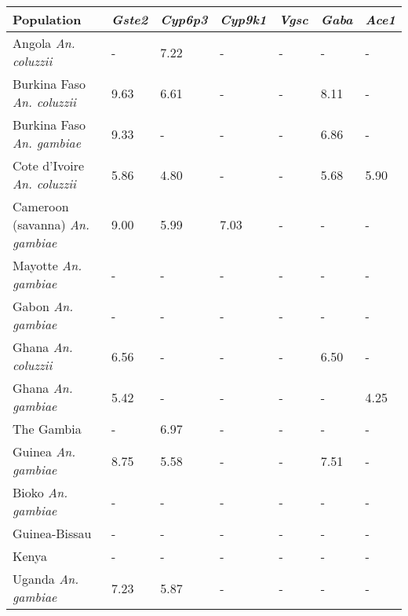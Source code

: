 \begin{tabular}{lllllll}
\toprule
                              Population & \textit{Gste2} & \textit{Cyp6p3} & \textit{Cyp9k1} & \textit{Vgsc} & \textit{Gaba} & \textit{Ace1} \\
\midrule
            Angola \textit{An. coluzzii} &              - &            7.22 &               - &             - &             - &             - \\
      Burkina Faso \textit{An. coluzzii} &           9.63 &            6.61 &               - &             - &          8.11 &             - \\
       Burkina Faso \textit{An. gambiae} &           9.33 &               - &               - &             - &          6.86 &             - \\
     Cote d'Ivoire \textit{An. coluzzii} &           5.86 &            4.80 &               - &             - &          5.68 &          5.90 \\
 Cameroon (savanna) \textit{An. gambiae} &           9.00 &            5.99 &            7.03 &             - &             - &             - \\
            Mayotte \textit{An. gambiae} &              - &               - &               - &             - &             - &             - \\
              Gabon \textit{An. gambiae} &              - &               - &               - &             - &             - &             - \\
             Ghana \textit{An. coluzzii} &           6.56 &               - &               - &             - &          6.50 &             - \\
              Ghana \textit{An. gambiae} &           5.42 &               - &               - &             - &             - &          4.25 \\
                              The Gambia &              - &            6.97 &               - &             - &             - &             - \\
             Guinea \textit{An. gambiae} &           8.75 &            5.58 &               - &             - &          7.51 &             - \\
              Bioko \textit{An. gambiae} &              - &               - &               - &             - &             - &             - \\
                           Guinea-Bissau &              - &               - &               - &             - &             - &             - \\
                                   Kenya &              - &               - &               - &             - &             - &             - \\
             Uganda \textit{An. gambiae} &           7.23 &            5.87 &               - &             - &             - &             - \\
\bottomrule
\end{tabular}
